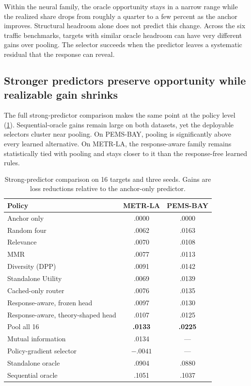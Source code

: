 Within the neural family, the oracle opportunity stays in a narrow range while
the realized share drops from roughly a quarter to a few percent as the anchor
improves. Structural headroom alone does not predict this change. Across the
six traffic benchmarks, targets with similar oracle headroom can have very
different gains over pooling. The selector succeeds when the predictor leaves a
systematic residual that the response can reveal.


\subsection{Stronger predictors preserve opportunity while realizable gain shrinks}

The full strong-predictor comparison makes the same point at the policy level
(\cref{tab:strong-backbone}). Sequential-oracle gains remain large on both
datasets, yet the deployable selectors cluster near pooling. On PEMS-BAY,
pooling is significantly above every learned alternative. On METR-LA, the
response-aware family remains statistically tied with pooling and stays closer
to it than the response-free learned rules.

\begin{table}[t]
 \centering
 \small
 \caption{Strong-predictor comparison on 16 targets and three seeds. Gains are
 loss reductions relative to the anchor-only predictor.}
 \label{tab:strong-backbone}
 \begin{tabular}{lcc}
  \toprule
  Policy & METR-LA & PEMS-BAY\\
  \midrule
  Anchor only & .0000 & .0000\\
  Random four & .0062 & .0163\\
  Relevance & .0070 & .0108\\
  MMR & .0077 & .0113\\
  Diversity (DPP) & .0091 & .0142\\
  Standalone Utility & .0069 & .0139\\
  Cached-only router & .0076 & .0135\\
  Response-aware, frozen head & .0097 & .0130\\
  Response-aware, theory-shaped head & .0107 & .0125\\
  Pool all 16 & \textbf{.0133} & \textbf{.0225}\\
  Mutual information & .0134 & ---\\
  Policy-gradient selector & $-.0041$ & ---\\
  Standalone oracle & .0904 & .0880\\
  Sequential oracle & .1051 & .1037\\
  \bottomrule
 \end{tabular}
\end{table}

